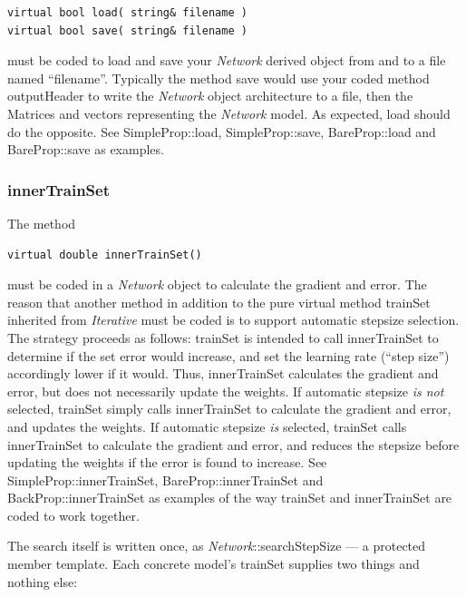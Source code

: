 \documentclass{report}
\begin{document}
\begin{verbatim}
virtual bool load( string& filename )
virtual bool save( string& filename )
\end{verbatim}

must be coded to load and save your {\em Network} derived object from
and to a file named ``filename''.  Typically the method save would use
your coded method outputHeader to write the {\em Network} object
architecture to a file, then the Matrices and vectors representing the
{\em Network} model.  As expected, load should do the opposite.  See
SimpleProp::load, SimpleProp::save, BareProp::load and BareProp::save
as examples.

\subsubsection{innerTrainSet}\label{autoStep}

The method

\begin{verbatim}
virtual double innerTrainSet()
\end{verbatim}

must be coded in a {\em Network} object to calculate the gradient and
error.  The reason that another method in addition to the pure virtual
method trainSet inherited from {\em Iterative} must be coded is to
support automatic stepsize selection.  The strategy proceeds as
follows: trainSet is intended to call innerTrainSet to determine if
the set error would increase, and set the learning rate (``step
size'') accordingly lower if it would.  Thus, innerTrainSet calculates
the gradient and error, but does not necessarily update the weights.
If automatic stepsize {\em is not} selected, trainSet simply calls
innerTrainSet to calculate the gradient and error, and updates the
weights.  If automatic stepsize {\em is} selected, trainSet calls
innerTrainSet to calculate the gradient and error, and reduces the
stepsize before updating the weights if the error is found to
increase. See SimpleProp::innerTrainSet, BareProp::innerTrainSet and
BackProp::innerTrainSet as examples of the way trainSet and
innerTrainSet are coded to work together.

The search itself is written once, as {\em Network}::searchStepSize --- a
protected member template.  Each concrete model's trainSet supplies two
things and nothing else:
\end{document}
